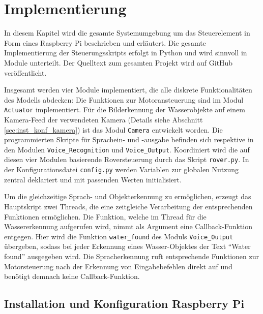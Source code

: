 \chapter{Implementierung}
\label{chp:implementierung}

In diesem Kapitel wird die gesamte Systemumgebung um das Steuerelement in Form eines Raspberry Pi beschrieben und erläutert.
Die gesamte Implementierung der Steuerungsskripts erfolgt in Python und wird sinnvoll in Module unterteilt.
Der Quelltext zum gesamten Projekt wird auf GitHub veröffentlicht.

Insgesamt werden vier Module implementiert, die alle diskrete Funktionalitäten des Modells abdecken: Die Funktionen zur Motoransteuerung sind im Modul \texttt{Actuator} implementiert. 
Für die Bilderkennung der Wasserobjekte auf einem Kamera-Feed der verwendeten Kamera (Details siehe Abschnitt \ref{sec:inst_konf_kamera}) ist das Modul \texttt{Camera} entwickelt worden.
Die programmierten Skripte für Sprachein- und -ausgabe befinden sich respektive in den Modulen \texttt{Voice\_Recognition} und \texttt{Voice\_Output}.
Koordiniert wird die auf diesen vier Modulen basierende Roversteuerung durch das Skript \texttt{rover.py}.
In der Konfigurationsdatei \texttt{config.py} werden Variablen zur globalen Nutzung zentral deklariert und mit passenden Werten initialisiert.

Um die gleichzeitige Sprach- und Objekterkennung zu ermöglichen, erzeugt das Hauptskript zwei Threads, die eine zeitgleiche Verarbeitung der entsprechenden Funktionen ermöglichen.
Die Funktion, welche im Thread für die Wassererkennung aufgerufen wird, nimmt als Argument eine Callback-Funktion entgegen.
Hier wird die Funktion \texttt{water\_found} des Moduls \texttt{Voice\_Output} übergeben, sodass bei jeder Erkennung eines Wasser-Objektes der Text \enquote{Water found} ausgegeben wird.
Die Spracherkennung ruft entsprechende Funktionen zur Motorsteuerung nach der Erkennung von Eingabebefehlen direkt auf und benötigt demnach keine Callback-Funktion.

\section{Installation und Konfiguration Raspberry Pi}
\label{sec:inst_konf_raspi}

